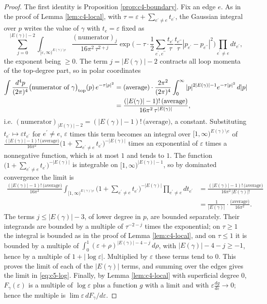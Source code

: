 \begin{proof}
The first identity is Proposition \ref{prop:c4-boundary}. Fix an edge $e$. As in the proof of Lemma \ref{lem:c4-local}, with $\tau=\varepsilon+\sum_{e^{\prime}\neq e}t_{e^{\prime}}$, the Gaussian integral over $p$ writes the value of $\gamma$ with $t_e=\varepsilon$ fixed as
\[
\sum_{j=0}^{|E(\gamma)|-2}\int_{[\varepsilon,\infty)^{E(\gamma)\setminus e}}\frac{(\text{numerator})_j}{16\pi^2\,\tau^{2+j}}\exp\Big(-\tau\cdot\frac12\sum_{e^{\prime},e^{\prime\prime}}\frac{t_{e^{\prime}}}{\tau}\frac{t_{e^{\prime\prime}}}{\tau}|p_{e^{\prime}}-p_{e^{\prime\prime}}|^2\Big)\prod_{e^{\prime}\neq e}dt_{e^{\prime}} ,
\]
the exponent being $\ge0$. The term $j=|E(\gamma)|-2$ contracts all loop momenta of the top-degree part, so in polar coordinates
\[
\begin{aligned}
\int\frac{d^4p}{(2\pi)^4}\big(\text{numerator of }\gamma\big)_{\rm top}(p)\,e^{-\tau|p|^2}&=\text{(average)}\cdot\frac{2\pi^2}{(2\pi)^4}\int_0^\infty|p|^{2|E(\gamma)|-1}e^{-\tau|p|^2}\,d|p|\\
&=\frac{(|E(\gamma)|-1)!\,\text{(average)}}{16\pi^2\,\tau^{|E(\gamma)|}},
\end{aligned}
\]
i.e. $(\text{numerator})_{|E(\gamma)|-2}=(|E(\gamma)|-1)!\,\text{(average)}$, a constant. Substituting $t_{e^{\prime}}\mapsto\varepsilon t_{e^{\prime}}$ for $e^{\prime}\neq e$, $\varepsilon$ times this term becomes an integral over $[1,\infty)^{E(\gamma)\setminus e}$ of $\frac{(|E(\gamma)|-1)!\,\text{(average)}}{16\pi^2}\big(1+\sum_{e^{\prime}\neq e}t_{e^{\prime}}\big)^{-|E(\gamma)|}$ times an exponential of $\varepsilon$ times a nonnegative function, which is at most $1$ and tends to $1$. The function $\big(1+\sum_{e^{\prime}\neq e}t_{e^{\prime}}\big)^{-|E(\gamma)|}$ is integrable on $[1,\infty)^{|E(\gamma)|-1}$, so by dominated convergence the limit is
\[
\begin{aligned}
\frac{(|E(\gamma)|-1)!\,\text{(average)}}{16\pi^2}\int_{[1,\infty)^{E(\gamma)\setminus e}}\Big(1+\sum_{e^{\prime}\neq e}t_{e^{\prime}}\Big)^{-|E(\gamma)|}\prod_{e^{\prime}\neq e}dt_{e^{\prime}}&=\frac{(|E(\gamma)|-1)!\,\text{(average)}}{16\pi^2\,|E(\gamma)|!}\\
&=\frac{1}{|E(\gamma)|}\cdot\frac{\text{(average)}}{16\pi^2}.
\end{aligned}
\]
The terms $j\le|E(\gamma)|-3$, of lower degree in $p$, are bounded separately. Their integrands are bounded by a multiple of $\tau^{-2-j}$ times the exponential; on $\tau\ge1$ the integral is bounded as in the proof of Lemma \ref{lem:c4-local}, and on $\tau\le1$ it is bounded by a multiple of $\int_0^1(\varepsilon+\rho)^{|E(\gamma)|-4-j}\,d\rho$, with $|E(\gamma)|-4-j\ge-1$, hence by a multiple of $1+|\log\varepsilon|$. Multiplied by $\varepsilon$ these terms tend to $0$. This proves the limit of each of the $|E(\gamma)|$ terms, and summing over the edges gives the limit in \eqref{eq:c5-log}. Finally, by Lemma \ref{lem:c4-local} with superficial degree $0$, $F_\gamma(\varepsilon)$ is a multiple of $\log\varepsilon$ plus a function $g$ with a limit and with $\varepsilon\frac{dg}{d\varepsilon}\to0$; hence the multiple is $\lim\varepsilon\,dF_\gamma/d\varepsilon$.
\end{proof}

